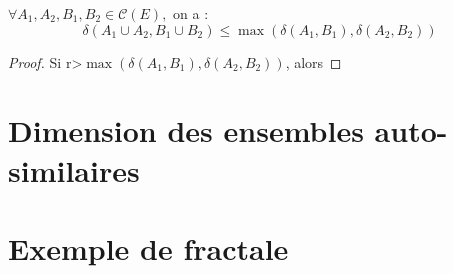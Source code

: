 \documentclass[a4paper, 12pt]{report}
\begin{document}
		\begin{lemma}
			$\forall A_1,A_2,B_1,B_2\in\mathcal{C}(E),$ on a :
			\begin{equation*}
				\delta(A_1\cup A_2 , B_1\cup B_2)\leq \max(\delta(A_1,B_1), \delta(A_2,B_2))
			\end{equation*}
		\end{lemma}
	
	\begin{proof}
		Si r>$\max(\delta(A_1,B_1), \delta(A_2,B_2))$, alors 
	\end{proof}

	


	\chapter{\bf Dimension des ensembles auto-similaires}
	
	\chapter{\bf Exemple de fractale}
\end{document}
